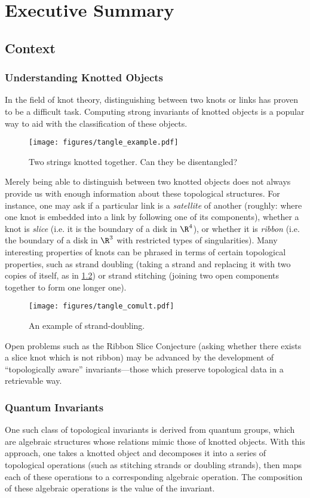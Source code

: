 \chapter{Executive Summary}
\label{ch:summary}

\section{Context}
\subsection{Understanding Knotted Objects}
In the field of knot theory, distinguishing between two knots or links
has proven to be a difficult task. Computing strong invariants of knotted
objects is a popular way to aid with the classification of these objects.
\begin{figure}[h]
        \centering
        \texttt{[image: figures/tangle\_example.pdf]}
        \caption{Two strings knotted together. Can they be disentangled?}
        \label{fig:unknot}
\end{figure}

Merely being able to distinguish between two knotted objects does not always
provide us with enough information about these topological structures. For
instance, one may ask if a particular link is a \emph{satellite} of another
(roughly: where one knot is embedded into a link by following one of its
components), whether a knot is \emph{slice} (i.e. it is the boundary of a disk in
$\R^4$), or whether it is \emph{ribbon} (i.e. the boundary of a disk in $\R^3$
with restricted types of singularities). Many interesting properties of knots
can be phrased in terms of certain topological properties, such as strand
doubling (taking a strand and replacing it with two copies of itself, as in
\cref{fig:strand_double}) or strand stitching (joining two open components
together to form one longer one).
\begin{figure}[h]
        \centering
        \texttt{[image: figures/tangle\_comult.pdf]}
        \caption{An example of strand-doubling.}
        \label{fig:strand_double}
\end{figure}

Open problems such as the Ribbon Slice Conjecture (asking whether there exists a
slice knot which is not ribbon) may be advanced by the development of
\enquote{topologically aware} invariants---those which preserve topological data
in a retrievable way.

\subsection{Quantum Invariants}
One such class of topological invariants is derived from quantum groups, which
are algebraic structures whose relations mimic those of knotted objects. With
this approach, one takes a knotted object and decomposes it into a series of
topological operations (such as stitching strands or doubling strands), then
maps each of these operations to a corresponding algebraic operation. The
composition of these algebraic operations is the value of the invariant.

